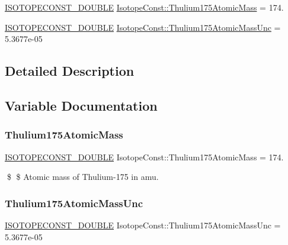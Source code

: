\begin{DoxyCompactItemize}
\item 
\mbox{\hyperlink{group___isotope_const-_macros_ga8f45a7272ce02c0b4c65c44636ed719a}{I\+S\+O\+T\+O\+P\+E\+C\+O\+N\+S\+T\+\_\+\+D\+O\+U\+B\+LE}} \mbox{\hyperlink{group___isotope_const-_thulium-_tm175_gae1737ddca4c6e58bb66cc8574fd173e9}{Isotope\+Const\+::\+Thulium175\+Atomic\+Mass}} = 174.
\item 
\mbox{\hyperlink{group___isotope_const-_macros_ga8f45a7272ce02c0b4c65c44636ed719a}{I\+S\+O\+T\+O\+P\+E\+C\+O\+N\+S\+T\+\_\+\+D\+O\+U\+B\+LE}} \mbox{\hyperlink{group___isotope_const-_thulium-_tm175_ga84b80b49841eb6ce07e1ed84b8f30a6a}{Isotope\+Const\+::\+Thulium175\+Atomic\+Mass\+Unc}} = 5.\+3677e-\/05
\end{DoxyCompactItemize}


\subsection{Detailed Description}


\subsection{Variable Documentation}
\mbox{\label{group___isotope_const-_thulium-_tm175_gae1737ddca4c6e58bb66cc8574fd173e9}} 
\subsubsection{\texorpdfstring{Thulium175\+Atomic\+Mass}{Thulium175AtomicMass}}
{\footnotesize\ttfamily \mbox{\hyperlink{group___isotope_const-_macros_ga8f45a7272ce02c0b4c65c44636ed719a}{I\+S\+O\+T\+O\+P\+E\+C\+O\+N\+S\+T\+\_\+\+D\+O\+U\+B\+LE}} Isotope\+Const\+::\+Thulium175\+Atomic\+Mass = 174.}

\$ \$ Atomic mass of Thulium-\/175 in amu. \mbox{\label{group___isotope_const-_thulium-_tm175_ga84b80b49841eb6ce07e1ed84b8f30a6a}} 
\subsubsection{\texorpdfstring{Thulium175\+Atomic\+Mass\+Unc}{Thulium175AtomicMassUnc}}
{\footnotesize\ttfamily \mbox{\hyperlink{group___isotope_const-_macros_ga8f45a7272ce02c0b4c65c44636ed719a}{I\+S\+O\+T\+O\+P\+E\+C\+O\+N\+S\+T\+\_\+\+D\+O\+U\+B\+LE}} Isotope\+Const\+::\+Thulium175\+Atomic\+Mass\+Unc = 5.\+3677e-\/05}

